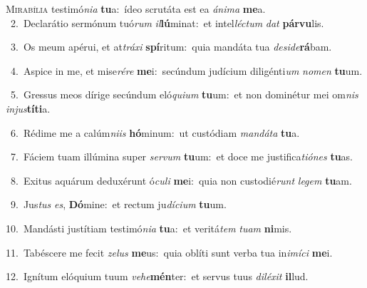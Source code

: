 \lettrine{\initial\textcolor{\initialcolor}{M}}{irabília} testimó\-\textit{ni}\-\textit{a} \textbf{tu}\-a:~\star ídeo scrutáta est ea \textit{á}\-\textit{ni}\textit{ma} \textbf{me}\-a.\\
{\numbfont\textcolor{\numbcolor}{~2.}}~Declarátio sermónum tuó\textit{rum} \textit{il}\-\textbf{lú}minat:~\star et intel\-\textit{léc}\-\textit{tum} \textit{dat} \textbf{pár}\-\textbf{vu}lis.\par
{\numbfont\textcolor{\numbcolor}{~3.}}~Os meum apérui, et at\-\textit{trá}\-\textit{xi} \textbf{spí}\-ritum:~\star quia mandáta tua \textit{de}\-\textit{si}\textit{de}\textbf{rá}bam.\par
{\numbfont\textcolor{\numbcolor}{~4.}}~Aspice in me, et mise\-\textit{ré}\-\textit{re} \textbf{me}\-i:~\star secúndum judícium diligénti\textit{um} \textit{no}\-\textit{men} \textbf{tu}\-um.\par
{\numbfont\textcolor{\numbcolor}{~5.}}~Gressus meos dírige secúndum eló\-\textit{qui}\-\textit{um} \textbf{tu}\-um:~\star et non dominétur mei om\textit{nis} \textit{in}\-\textit{jus}\textbf{tí}\textbf{ti}a.\par
{\numbfont\textcolor{\numbcolor}{~6.}}~Rédime me a calúm\-\textit{ni}\-\textit{is} \textbf{hó}\-minum:~\star ut custódiam \textit{man}\-\textit{dá}\textit{ta} \textbf{tu}\-a.\par
{\numbfont\textcolor{\numbcolor}{~7.}}~Fáciem tuam illúmina super \textit{ser}\-\textit{vum} \textbf{tu}\-um:~\star et doce me justifica\-\textit{ti}\-\textit{ó}\textit{nes} \textbf{tu}\-as.\par
{\numbfont\textcolor{\numbcolor}{~8.}}~Exitus aquárum deduxérunt ó\-\textit{cu}\-\textit{li} \textbf{me}\-i:~\star quia non custodié\textit{runt} \textit{le}\-\textit{gem} \textbf{tu}\-am.\par
{\numbfont\textcolor{\numbcolor}{~9.}}~Jus\textit{tus} \textit{es}\-, \textbf{Dó}\-mine:~\star et rectum ju\-\textit{dí}\-\textit{ci}\textit{um} \textbf{tu}\-um.\par
{\numbfont\textcolor{\numbcolor}{10.}}~Mandásti justítiam testimó\-\textit{ni}\-\textit{a} \textbf{tu}\-a:~\star et veritá\textit{tem} \textit{tu}\-\textit{am} \textbf{ni}\-mis.\par
{\numbfont\textcolor{\numbcolor}{11.}}~Tabéscere me fecit \textit{ze}\-\textit{lus} \textbf{me}\-us:~\star quia oblíti sunt verba tua in\-\textit{i}\-\textit{mí}\textit{ci} \textbf{me}\-i.\par
{\numbfont\textcolor{\numbcolor}{12.}}~Ignítum elóquium tuum \textit{ve}\-\textit{he}\textbf{mén}ter:~\star et servus tuus \textit{di}\-\textit{lé}\textit{xit} \textbf{il}\-lud.\par
